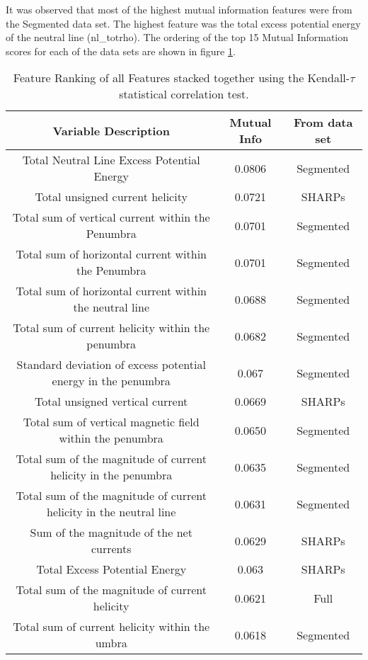 It was observed that most of the highest mutual information features were from the Segmented data set. The highest feature was the total excess potential energy of the neutral line (nl\_totrho). The ordering of the top 15 Mutual Information scores for each of the data sets are shown in figure \ref{tbl:ftrank}.
\begin{table}
\begin{center}
\begin{tabular}{c|c|c}
     Variable Description & Mutual Info & From data set \\
     \hline
     Total Neutral Line Excess Potential Energy & 0.0806 & Segmented \\
     Total unsigned current helicity & 0.0721 & SHARPs \\
     Total sum of vertical current within the Penumbra & 0.0701 & Segmented \\
     Total sum of horizontal current within the Penumbra & 0.0701 & Segmented \\
     Total sum of horizontal current within the neutral line & 0.0688 & Segmented \\
     Total sum of current helicity within the penumbra & 0.0682 & Segmented \\
     Standard deviation of excess potential energy in the penumbra & 0.067 & Segmented \\
     Total unsigned vertical current & 0.0669 & SHARPs \\
     Total sum of vertical magnetic field within the penumbra & 0.0650 & Segmented \\
     Total sum of the magnitude of current helicity in the penumbra & 0.0635 & Segmented \\
     Total sum of the magnitude of current helicity in the neutral line & 0.0631 & Segmented \\
     Sum of the magnitude of the net currents & 0.0629 & SHARPs \\
     Total Excess Potential Energy & 0.063 & SHARPs \\
     Total sum of the magnitude of current helicity & 0.0621 & Full \\
     Total sum of current helicity within the umbra & 0.0618 & Segmented
\end{tabular}
\caption{Feature Ranking of all Features stacked together using the Kendall-$\tau$ statistical correlation test.} 
\label{tbl:ftrank}
\end{center}
\end{table}

